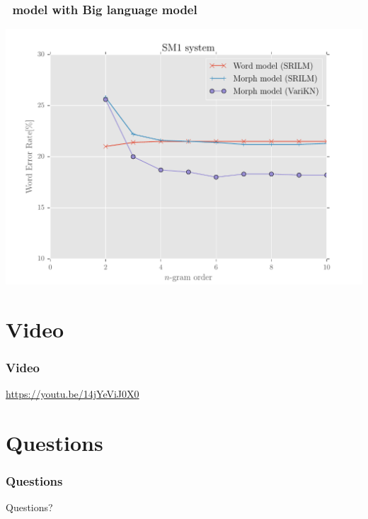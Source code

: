 \begin{frame}
\frametitle{\ns\ model with Big language model}
\includegraphics[width=.86\textwidth]{../figures/sme1}

\end{frame}


\section*{Video}
\begin{frame}
\frametitle{Video}
\begin{center}
\url{https://youtu.be/14jYeViJ0X0}
\end{center}
\end{frame}


\section*{Questions}

\begin{frame}
\frametitle{Questions}
\begin{center}
Questions?
\end{center}
\end{frame}


%
%


